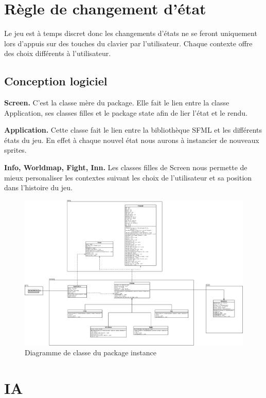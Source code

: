 \documentclass[12pt,a4paper]{report}
\begin{document}
\chapter{R\`{e}gle de changement d'\'{e}tat}

Le jeu est \`{a} temps discret donc les changements d'\'{e}tats ne se feront uniquement lors d'appuis sur des touches du clavier par l'utilisateur. Chaque contexte offre des choix diff\'{e}rents \`{a} l'utilisateur. 

\section{Conception logiciel}

\textbf{Screen.} C'est la classe m\`{e}re du package. Elle fait le lien entre la classe Application, ses classes filles et le package state afin de lier l'\'{e}tat et le rendu.

\textbf{Application.} Cette classe fait le lien entre la biblioth\`{e}que SFML et les diff\'{e}rents \'{e}tats du jeu. En effet \`{a} chaque nouvel \'{e}tat nous aurons \`{a} instancier de nouveaux sprites.

\textbf{Info, Worldmap, Fight, Inn.} Les classes filles de Screen nous permette de mieux personaliser les contextes suivant les choix de l'utilisateur et sa position dans l'histoire du jeu.

\begin{figure}
\caption{Diagramme de classe du package instance}
\includegraphics[width=1\textwidth]{instance.jpeg}
\end{figure}

\chapter{IA}
\end{document}
